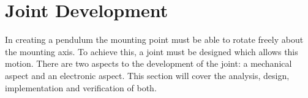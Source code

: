 \section{Joint Development}
\label{sec:joint_development}
In creating a pendulum the mounting point must be able to rotate freely about the mounting axis.
To achieve this, a joint must be designed which allows this motion.
There are two aspects to the development of the joint: a mechanical aspect and an electronic aspect.
This section will cover the analysis, design, implementation and verification of both.







